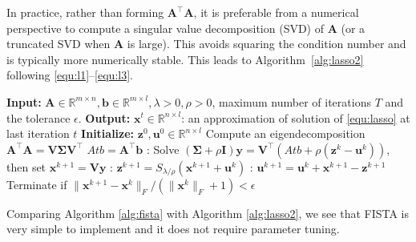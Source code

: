 \documentclass[10pt]{article}  	%
\theoremstyle{definition}
\theoremstyle{definition}
\newtheorem{remark}[theorem]{Remark}
\newcommand{\R}{{\mathbb{R}}}
\newcommand{\vb}{\mathbf{b}}
\newcommand{\vu}{\mathbf{u}}
\newcommand{\vx}{\mathbf{x}}
\newcommand{\vy}{\mathbf{y}}
\newcommand{\vz}{\mathbf{z}}
\newcommand{\mA}{\mathbf{A}}
\newcommand{\mI}{\mathbf{I}}
\newcommand{\mV}{\mathbf{V}}
\theoremstyle{remark}
\begin{document}
In practice, rather than forming $\mA^\top \mA$, it is preferable from a numerical perspective to compute a singular value decomposition (SVD) of $\mA$ (or a truncated SVD when $\mA$ is large). This avoids squaring the condition number and is typically more numerically stable.
This leads to Algorithm~\ref{alg:lasso2} following \eqref{equ:l1}--\eqref{equ:l3}.


\begin{algorithm}[htb]
\caption{LASSO($\mA, \vb, \lambda; \rho, T, \epsilon$): ADMM}\label{alg:lasso2}
\begin{algorithmic}
\State\textbf{Input:} $\mA\in\R^{m\times n}, \vb\in\R^{m\times l}, \lambda >0, \rho>0$, maximum number of iterations $T$ and the tolerance $\epsilon$.
\State\textbf{Output:} $\vx^{t}\in\R^{n\times l}$: an approximation of solution of \eqref{equ:lasso} at last iteration $t$
\State\textbf{Initialize:} $\vz^0, \vu^0 \in\R^{n\times l}$
\State Compute an eigendecomposition $\mA^\top \mA = \mV \mathbf{\Sigma} \mV^\top$
\State $Atb = \mA^\top \vb$ %
: Solve $(\mathbf{\Sigma} + \rho \mI)\vy = \mV^\top(Atb + \rho (\vz^k - \vu^k))$, then set $\vx^{k+1} = \mV \vy$
: $\vz^{k+1} = S_{\lambda/\rho}(\vx^{k+1} + \vu^k)$ %
: $\vu^{k+1} = \vu^k + \vx^{k+1} - \vz^{k+1}$ %
\State Terminate if $\|\vx^{k+1}-\vx^k\|_F/(\|\vx^k\|_F+1) <\epsilon$ 
\EndFor
\end{algorithmic}
\end{algorithm}

Comparing Algorithm \ref{alg:fista} with Algorithm \ref{alg:lasso2}, we see that FISTA is very simple to implement and it does not require parameter tuning.




 
\end{document}
